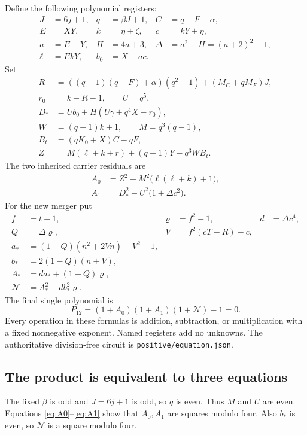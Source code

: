 \documentclass[11pt]{article}
\theoremstyle{remark}\newtheorem{remark}[theorem]{Remark}
\begin{document}
Define the following polynomial registers:
\begin{align*}
 J&=6j+1,& q&=\beta J+1,& C&=q-F-\alpha,\\
 E&=XY,& k&=\eta+\zeta,& c&=kY+\eta,\\
 a&=E+Y,& H&=4a+3,& \Delta&=a^2+H=(a+2)^2-1,\\
 \ell&=EkY,& b_0&=X+ac.&&
\end{align*}
Set
\begin{align*}
 R&=((q-1)(q-F)+\alpha)(q^2-1)+(M_C+qM_F)J,\\
 r_0&=k-R-1,\qquad U=q^5,\\
 D_*&=Ub_0+H(U\gamma+q^4X-r_0),\\
 W&=(q-1)k+1,\qquad M=q^3(q-1),\\
 B_t&=(qK_0+X)C-qF,\\
 Z&=M(\ell+k+r)+(q-1)Y-q^3WB_t.
\end{align*}
The two inherited carrier residuals are
\begin{align}
 A_0&=Z^2-M^2\bigl(\ell(\ell+k)+1\bigr),\label{eq:A0}\\
 A_1&=D_*^2-U^2\bigl(1+\Delta c^2\bigr).\label{eq:A1}
\end{align}
For the new merger put
\begin{align*}
 f&=t+1,& \varrho&=f^2-1,& d&=\Delta c^4,\\
 Q&=\Delta\varrho,& V&=f^2(cT-R)-c,\\
 a_*&=(1-Q)(n^2+2Vn)+V^2-1,\\
 b_*&=2(1-Q)(n+V),\\
 A_*&=d a_*+(1-Q)\varrho,\\
 \mathcal N&=A_*^2-d b_*^2\varrho.
\end{align*}
The final single polynomial is
\begin{equation}\boxed{\displaystyle
 P_{12}=(1+A_0)(1+A_1)(1+\mathcal N)-1=0.}\label{eq:P12}\end{equation}
Every operation in these formulas is addition, subtraction, or multiplication with a fixed nonnegative exponent. Named registers add no unknowns. The authoritative division-free circuit is \texttt{positive/equation.json}.

\subsection{The product is equivalent to three equations}

The fixed $\beta$ is odd and $J=6j+1$ is odd, so $q$ is even. Thus $M$ and $U$ are even. Equations \eqref{eq:A0}--\eqref{eq:A1} show that $A_0,A_1$ are squares modulo four. Also $b_*$ is even, so $\mathcal N$ is a square modulo four.
\end{document}
